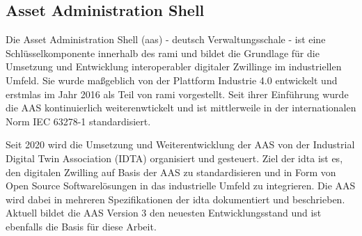 


\newpage
\subsection{Asset Administration Shell}
\label{chap:AAS}



Die Asset Administration Shell (\ac{aas}) - deutsch Verwaltungsschale - ist eine Schlüsselkomponente innerhalb des \ac{rami} \cite{RAMI4.0} und bildet die Grundlage für die Umsetzung und Entwicklung interoperabler digitaler Zwillinge im industriellen Umfeld.
Sie wurde maßgeblich von der Plattform Industrie 4.0 entwickelt und erstmlas im Jahr 2016 als Teil von \acs{rami} vorgestellt.
Seit ihrer Einführung wurde die AAS kontinuierlich weiterenwtickelt und ist mittlerweile in der internationalen Norm IEC 63278-1 \cite{AASIEC63278} standardisiert.

Seit 2020 wird die Umsetzung und Weiterentwicklung der AAS von der Industrial Digital Twin Association (IDTA) \cite{IDTA} organisiert und gesteuert.
Ziel der \acs{idta} ist es, den digitalen Zwilling auf Basis der AAS zu standardisieren und in Form von Open Source Softwarelösungen in das industrielle Umfeld zu integrieren.
Die AAS wird dabei in mehreren Spezifikationen der \acs{idta} dokumentiert und beschrieben.
Aktuell bildet die AAS Version 3 den neuesten Entwicklungsstand und ist ebenfalls die Basis für diese Arbeit.

